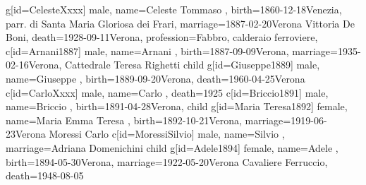 \documentclass{article}
\begin{document}
\begin{midpage}
\begin{center}
\begin{genealogypicture}
{{{{{                    g[id=CelesteXxxx]{
                        male,
                        name={Celeste Tommaso },
                        birth={1860-12-18}{Venezia, parr. di Santa Maria Gloriosa dei Frari},
                        marriage={1887-02-20}{Verona \newline Vittoria De Boni},
                        death={1928-09-11}{Verona},
                        profession={Fabbro, calderaio ferroviere},
                    }
                    c[id=Arnani1887]{
                        male,
                        name={Arnani },
                        birth={1887-09-09}{Verona},
                        marriage={1935-02-16}{Verona, Cattedrale \newline Teresa Righetti}
                    }
                    child{
                        g[id=Giuseppe1889]{
                            male,
                            name={Giuseppe },
                            birth={1889-09-20}{Verona},
                            death={1960-04-25}{Verona}
                        }
                        c[id=CarloXxxx]{
                            male,
                            name={Carlo },
                            death={1925}{}
                        }
                    }
                    c[id=Briccio1891]{
                        male,
                        name={Briccio },
                        birth={1891-04-28}{Verona},
                    }
                    child{
                        g[id=Maria Teresa1892]{
                            female,
                            name={Maria Emma Teresa },
                            birth={1892-10-21}{Verona},
                            marriage={1919-06-23}{Verona \newline Moressi Carlo}
                        }
                        c[id=MoressiSilvio]{
                            male,
                            name={Silvio },
                            marriage={Adriana Domenichini}{}
                        }
                    }
                    child{
                        g[id=Adele1894]{
                            female,
                            name={Adele },
                            birth={1894-05-30}{Verona},
                            marriage={1922-05-20}{Verona \newline Cavaliere Ferruccio},
                            death={1948-08-05}{}
                        }
}}}}}}
\end{genealogypicture}
\end{center}
\end{midpage}
\end{document}

